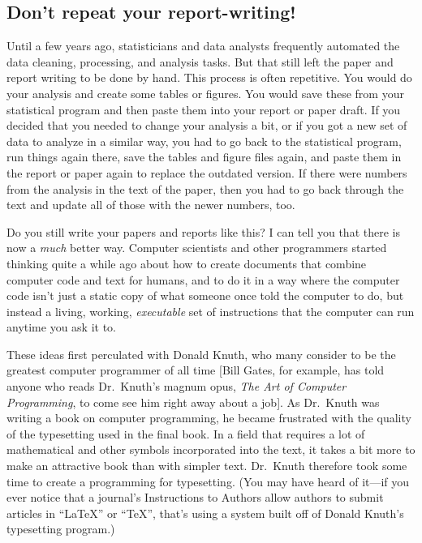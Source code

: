 \documentclass[]{tufte-book}
\begin{document}
\hypertarget{dont-repeat-your-report-writing}{%
\subsection{Don't repeat your report-writing!}\label{dont-repeat-your-report-writing}}

Until a few years ago, statisticians and data analysts frequently automated the
data cleaning, processing, and analysis tasks. But that still left the paper
and report writing to be done by hand. This process is often repetitive. You would
do your analysis and create some tables or figures. You would save these from
your statistical program and then paste them into your report or paper draft.
If you decided that you needed to change your analysis a bit, or if you got a new
set of data to analyze in a similar way, you had to go back to the statistical
program, run things again there, save the tables and figure files again, and paste
them in the report or paper again to replace the outdated version. If there were
numbers from the analysis in the text of the paper, then you had to go back through
the text and update all of those with the newer numbers, too.

Do you still write your papers and reports like this? I can tell you that there is
now a \emph{much} better way. Computer scientists and other programmers started thinking
quite a while ago about how to create documents that combine computer code and
text for humans, and to do it in a way where the computer code isn't just a static
copy of what someone once told the computer to do, but instead a living, working,
\emph{executable} set of instructions that the computer can run anytime you ask it to.

These ideas first perculated with Donald Knuth, who many consider to be the greatest
computer programmer of all time {[}Bill Gates, for example, has told anyone who reads Dr.~Knuth's
magnum opus, \emph{The Art of Computer Programming}, to come see him right away about a job{]}.
As Dr.~Knuth was writing a book on computer programming, he became frustrated with the
quality of the typesetting used in the final book. In a field that requires a lot of mathematical
and other symbols incorporated into the text, it takes a bit more to make an attractive
book than with simpler text. Dr.~Knuth therefore took some time to create a programming
for typesetting. (You may have heard of it---if you ever notice that a journal's
Instructions to Authors allow authors to submit articles in ``LaTeX'' or ``TeX'', that's
using a system built off of Donald Knuth's typesetting program.)
\end{document}
